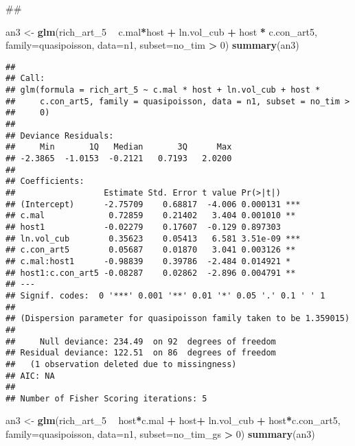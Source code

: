 \documentclass[]{article}
\newenvironment{Shaded}{\begin{snugshade}}{\end{snugshade}}
\newcommand{\KeywordTok}[1]{\textcolor[rgb]{0.13,0.29,0.53}{\textbf{#1}}}
\newcommand{\DataTypeTok}[1]{\textcolor[rgb]{0.13,0.29,0.53}{#1}}
\newcommand{\DecValTok}[1]{\textcolor[rgb]{0.00,0.00,0.81}{#1}}
\newcommand{\StringTok}[1]{\textcolor[rgb]{0.31,0.60,0.02}{#1}}
\newcommand{\OperatorTok}[1]{\textcolor[rgb]{0.81,0.36,0.00}{\textbf{#1}}}
\newcommand{\NormalTok}[1]{#1}
\begin{document}
\begin{Shaded}
\begin{Highlighting}[]
\NormalTok{##}


\NormalTok{an3 <-}\StringTok{ }\KeywordTok{glm}\NormalTok{(rich_art_}\DecValTok{5} \OperatorTok{~}\StringTok{ }\NormalTok{c.mal}\OperatorTok{*}\NormalTok{host }\OperatorTok{+}\StringTok{ }\NormalTok{ln.vol_cub }\OperatorTok{+}\StringTok{ }\NormalTok{host }\OperatorTok{*}\StringTok{ }\NormalTok{c.con_art5, }
           \DataTypeTok{family=}\NormalTok{quasipoisson, }\DataTypeTok{data=}\NormalTok{n1, }\DataTypeTok{subset=}\NormalTok{no_tim }\OperatorTok{>}\StringTok{ }\DecValTok{0}\NormalTok{)}
\KeywordTok{summary}\NormalTok{(an3)}
\end{Highlighting}
\end{Shaded}

\begin{verbatim}
## 
## Call:
## glm(formula = rich_art_5 ~ c.mal * host + ln.vol_cub + host * 
##     c.con_art5, family = quasipoisson, data = n1, subset = no_tim > 
##     0)
## 
## Deviance Residuals: 
##     Min       1Q   Median       3Q      Max  
## -2.3865  -1.0153  -0.2121   0.7193   2.0200  
## 
## Coefficients:
##                  Estimate Std. Error t value Pr(>|t|)    
## (Intercept)      -2.75709    0.68817  -4.006 0.000131 ***
## c.mal             0.72859    0.21402   3.404 0.001010 ** 
## host1            -0.02279    0.17607  -0.129 0.897303    
## ln.vol_cub        0.35623    0.05413   6.581 3.51e-09 ***
## c.con_art5        0.05687    0.01870   3.041 0.003126 ** 
## c.mal:host1      -0.98839    0.39786  -2.484 0.014921 *  
## host1:c.con_art5 -0.08287    0.02862  -2.896 0.004791 ** 
## ---
## Signif. codes:  0 '***' 0.001 '**' 0.01 '*' 0.05 '.' 0.1 ' ' 1
## 
## (Dispersion parameter for quasipoisson family taken to be 1.359015)
## 
##     Null deviance: 234.49  on 92  degrees of freedom
## Residual deviance: 122.51  on 86  degrees of freedom
##   (1 observation deleted due to missingness)
## AIC: NA
## 
## Number of Fisher Scoring iterations: 5
\end{verbatim}

\begin{Shaded}
\begin{Highlighting}[]
\NormalTok{an3 <-}\StringTok{ }\KeywordTok{glm}\NormalTok{(rich_art_}\DecValTok{5} \OperatorTok{~}\StringTok{ }\NormalTok{host}\OperatorTok{*}\NormalTok{c.mal }\OperatorTok{+}\StringTok{ }\NormalTok{host}\OperatorTok{+}\StringTok{ }\NormalTok{ln.vol_cub }\OperatorTok{+}\StringTok{ }\NormalTok{host}\OperatorTok{*}\NormalTok{c.con_art5, }
           \DataTypeTok{family=}\NormalTok{quasipoisson, }\DataTypeTok{data=}\NormalTok{n1, }\DataTypeTok{subset=}\NormalTok{no_tim_gs }\OperatorTok{>}\StringTok{ }\DecValTok{0}\NormalTok{)}
\KeywordTok{summary}\NormalTok{(an3)}
\end{Highlighting}
\end{Shaded}
\end{document}
